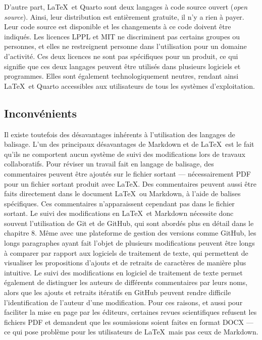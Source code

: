 \documentclass[
  letterpaper,
]{scrbook}
\begin{document}
D'autre part, \LaTeX~et Quarto sont deux langages à code source ouvert
(\emph{open source}). Ainsi, leur distribution est entièrement gratuite,
il n'y a rien à payer. Leur code source est disponible et les
changements à ce code doivent être indiqués. Les licences LPPL et MIT ne
discriminent pas certains groupes ou personnes, et elles ne restreignent
personne dans l'utilisation pour un domaine d'activité. Ces deux
licences ne sont pas spécifiques pour un produit, ce qui signifie que
ces deux langages peuvent être utilisés dans plusieurs logiciels et
programmes. Elles sont également technologiquement neutres, rendant
ainsi \LaTeX~et Quarto accessibles aux utilisateurs de tous les systèmes
d'exploitation.

\hypertarget{inconvuxe9nients}{%
\subsection{Inconvénients}\label{inconvuxe9nients}}

Il existe toutefois des désavantages inhérents à l'utilisation des
langages de balisage. L'un des principaux désavantages de Markdown et de
\LaTeX~est le fait qu'ils ne comportent aucun système de suivi des
modifications lors de travaux collaboratifs. Pour réviser un travail
fait en langage de balisage, des commentaires peuvent être ajoutés sur
le fichier sortant --- nécessairement PDF pour un fichier sortant
produit avec \LaTeX. Des commentaires peuvent aussi être faits
directement dans le document \LaTeX~ou Markdown, à l'aide de balises
spécifiques. Ces commentaires n'apparaissent cependant pas dans le
fichier sortant. Le suivi des modifications en \LaTeX~et Markdown
nécessite donc souvent l'utilisation de Git et de GitHub, qui sont
abordés plus en détail dans le chapitre 8. Même avec une plateforme de
gestion des versions comme GitHub, les longs paragraphes ayant fait
l'objet de plusieurs modifications peuvent être longs à comparer par
rapport aux logiciels de traitement de texte, qui permettent de
visualiser les propositions d'ajouts et de retraits de caractères de
manière plus intuitive. Le suivi des modifications en logiciel de
traitement de texte permet également de distinguer les auteurs de
différents commentaires par leurs noms, alors que les ajouts et retraits
itératifs en GitHub peuvent rendre difficile l'identification de
l'auteur d'une modification. Pour ces raisons, et aussi pour faciliter
la mise en page par les éditeurs, certaines revues scientifiques
refusent les fichiers PDF et demandent que les soumissions soient faites
en format DOCX --- ce qui pose problème pour les utilisateurs de
\LaTeX~mais pas ceux de Markdown.
\end{document}
